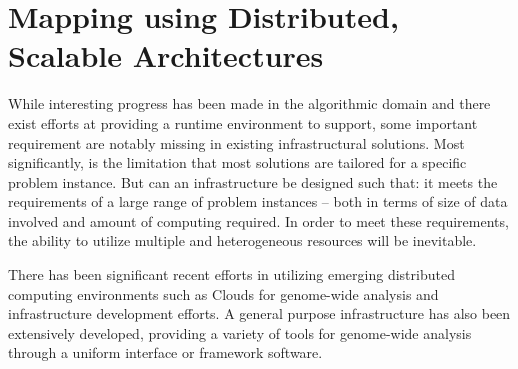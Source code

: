 \documentclass{acm_proc_article-sp}
\begin{document}
\section{Mapping using Distributed, Scalable Architectures}







While interesting progress has been made in the algorithmic domain and
there exist efforts at providing a runtime environment to support,
some important requirement are notably missing in existing
infrastructural solutions. Most significantly, is the limitation that
most solutions are tailored for a specific problem instance. But can
an infrastructure be designed such that: it meets the requirements of
a large range of problem instances -- both in terms of size of data
involved and amount of computing required.  In order to meet these
requirements, the ability to utilize multiple and heterogeneous
resources will be inevitable.

There has been significant recent efforts in utilizing emerging
distributed computing environments such as Clouds for genome-wide
analysis and infrastructure development
efforts\cite{taylor2010,cloudburst, cloudblast, langmead2009,
  langmead2010,gatk, halligan2009,luyf-2010}.
A general purpose infrastructure has also been extensively developed,
providing a variety of tools for genome-wide analysis through a
uniform interface or framework software\cite{galaxy}.
\end{document}
